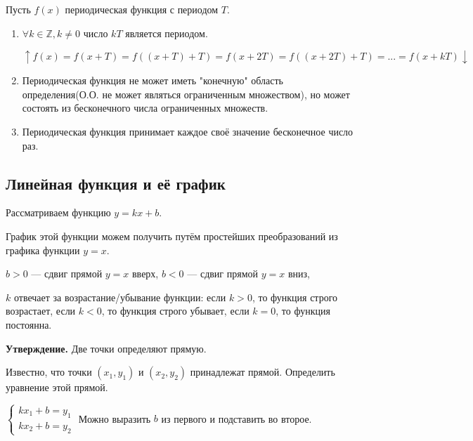 \documentclass{article}
\begin{document}
    Пусть \(f(x)\) периодическая функция с периодом \(T\).
    \begin{enumerate}
        \item \(\forall k \in \mathbb{Z}, k \not = 0\) число \(kT\) является периодом.
        
        \(\uparrow f(x)=f(x+T)=f((x+T)+T)=f(x+2T)=f((x+2T)+T)=...=f(x+kT) \downarrow\)
        \item Периодическая функция не может иметь "конечную" область определения(О.О. не может являться ограниченным множеством),
        но может состоять из бесконечного числа ограниченных множеств.
        \item Периодическая функция принимает каждое своё значение бесконечное число раз.
    \end{enumerate}

    \subsection{Линейная функция и её график}

    Рассматриваем функцию \(y=kx+b\).

    График этой функции можем получить путём простейших преобразований из графика функции \(y=x\).

    \(b>0\) --- сдвиг прямой \(y=x\) вверх, \(b<0\) --- сдвиг прямой \(y=x\) вниз,

    \(k\) отвечает за возрастание/убывание функции: если \(k>0\), то функция строго возрастает, если \(k<0\), то функция строго убывает, если \(k=0\), то функция постоянна.

    \textbf{Утверждение.} Две точки определяют прямую.

    Известно, что точки \((x_1, y_1)\) и \((x_2, y_2)\) принадлежат прямой. Определить уравнение этой прямой.

    \(\begin{cases}
        kx_1+b=y_1\\
        kx_2+b=y_2
    \end{cases}\)
    Можно выразить \(b\) из первого и подставить во второе.
\end{document}
